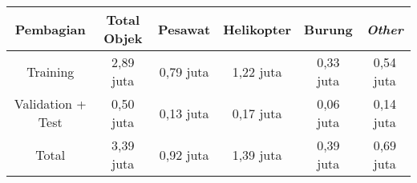 \begin{table}[H]
  \centering
  \label{tbl:datasetclasses}
  \begin{tabular}{|c|c|c|c|c|c|}
    \hline
    Pembagian & Total Objek & Pesawat & Helikopter & Burung & \emph{Other}\\
    \hline
    Training & 2,89 juta & 0,79 juta& 1,22 juta& 0,33 juta& 0,54 juta\\
    \hline
    Validation + Test &0,50 juta &0,13 juta & 0,17 juta&0,06 juta&0,14 juta\\
    \hline
    Total &3,39 juta &0,92 juta & 1,39 juta&0,39 juta&0,69 juta\\
    \hline
  \end{tabular}
\end{table}